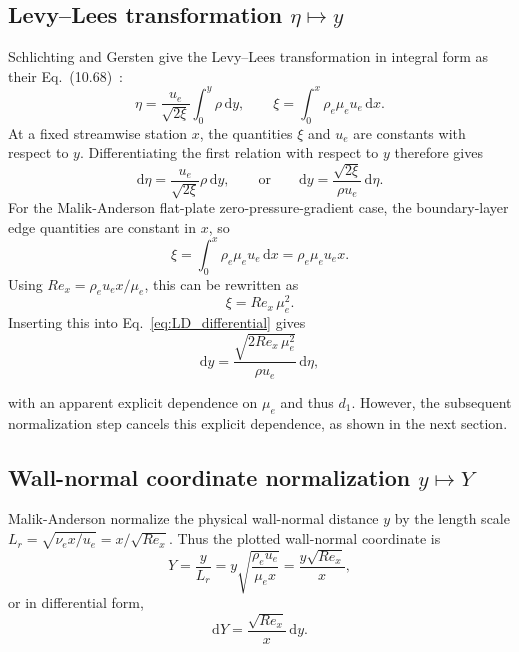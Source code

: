 \documentclass[11pt]{article}
\newcommand{\MA}{Malik-Anderson}
\newcommand{\dd}{\mathrm{d}}
\newcommand{\ue}{u_e}
\newcommand{\rhoe}{\rho_e}
\newcommand{\mue}{\mu_e}
\begin{document}
\subsection{\texorpdfstring{Levy--Lees transformation \(\eta \mapsto y\)}{Levy--Lees transformation eta to y}}\label{sec:LD_transformation}
Schlichting and Gersten give the Levy--Lees transformation in integral form as their Eq.~(10.68)~\cite{schlichting2017}:
\begin{equation}
  \eta=\frac{\ue}{\sqrt{2\xi}}\int_0^y \rho\,\dd y,
  \qquad
  \xi=\int_0^x \rho_e\mue\ue\,\dd x.
  \label{eq:LD_integral}
\end{equation}
At a fixed streamwise station \(x\), the quantities \(\xi\) and \(\ue\) are constants with respect to \(y\). Differentiating the first relation with respect to \(y\) therefore gives
\begin{equation}
  \dd\eta
  =
  \frac{\ue}{\sqrt{2\xi}}\rho\,\dd y,
  \qquad \text{or}\qquad
  \dd y
  =
  \frac{\sqrt{2\xi}}{\rho\ue}\,\dd\eta.
  \label{eq:LD_differential}
\end{equation}
For the \MA{} flat-plate zero-pressure-gradient case, the boundary-layer edge quantities are constant in \(x\), so
\begin{equation}
  \xi
  =
  \int_0^x \rhoe\mue\ue\,\dd x
  =
  \rhoe\mue\ue x.
  \label{eq:xi_flat_plate}
\end{equation}
Using \(Re_x=\rhoe\ue x/\mue\), this can be rewritten as
\begin{equation}
  \xi=Re_x\,\mue^2.
  \label{eq:xi_rex}
\end{equation}
Inserting this into Eq.~\eqref{eq:LD_differential} gives
\begin{equation}
  \dd y
  =
  \frac{\sqrt{2Re_x\,\mue^2}}{\rho \ue}\,\dd \eta,
  \label{eq:dy_rex}
\end{equation}

with an apparent explicit dependence on \(\mue\) and thus \(d_1\). However, the subsequent normalization step cancels this explicit dependence, as shown in the next section.

\subsection{\texorpdfstring{Wall-normal coordinate normalization \(y \mapsto Y\)}{Wall-normal coordinate normalization y to Y}}\label{sec:LD_normalization}

\MA{} normalize the physical wall-normal distance \(y\) by the length scale \(L_r=\sqrt{\nu_e x/\ue}=x/\sqrt{Re_x}\). Thus the plotted wall-normal coordinate is
\begin{equation}
  Y
  =
  \frac{y}{L_r}
  =
  y\sqrt{\frac{\rhoe\ue}{\mue x}}
  =
  \frac{y\sqrt{Re_x}}{x},
  \label{eq:Ydef}
\end{equation}
or in differential form,
\begin{equation}
  \dd Y
  =
  \frac{\sqrt{Re_x}}{x}\,\dd y.
  \label{eq:dYdef}
\end{equation}
\end{document}
